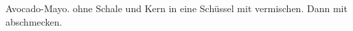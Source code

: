 \begin{recipe}{Avocado-Mayo.}
 ohne Schale und Kern in eine Schüssel mit
 vermischen. Dann mit
 abschmecken.
\end{recipe}